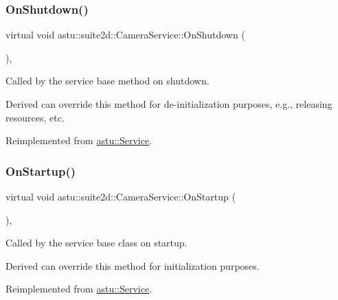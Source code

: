 \mbox{\label{classastu_1_1suite2d_1_1CameraService_ae820e7576e925c559b773bb0dbd5f091}} 
\subsubsection{\texorpdfstring{On\+Shutdown()}{OnShutdown()}}
{\footnotesize\ttfamily virtual void astu\+::suite2d\+::\+Camera\+Service\+::\+On\+Shutdown (\begin{DoxyParamCaption}{ }\end{DoxyParamCaption})\hspace{0.3cm}{\ttfamily [override]}, {\ttfamily [virtual]}}

Called by the service base method on shutdown.

Derived can override this method for de-\/initialization purposes, e.\+g., releasing resources, etc. 

Reimplemented from \hyperlink{classastu_1_1Service_a1e1dff727df791c57fae782d8a613c5f}{astu\+::\+Service}.

\mbox{\label{classastu_1_1suite2d_1_1CameraService_ac86690e80a0d6805abde747e501460ee}} 
\subsubsection{\texorpdfstring{On\+Startup()}{OnStartup()}}
{\footnotesize\ttfamily virtual void astu\+::suite2d\+::\+Camera\+Service\+::\+On\+Startup (\begin{DoxyParamCaption}{ }\end{DoxyParamCaption})\hspace{0.3cm}{\ttfamily [override]}, {\ttfamily [virtual]}}

Called by the service base class on startup.

Derived can override this method for initialization purposes. 

Reimplemented from \hyperlink{classastu_1_1Service_a357dc663e000b1f086f681ec3c459bfe}{astu\+::\+Service}.



